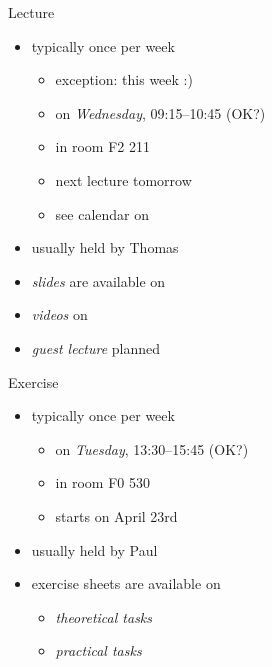 \begin{frame}{\myframetitle}
	\myframeicon{\fancyqr[image={\pic[width=10mm]{moodle-calendar}}]{\CalendarLink}}
	\begin{fancycolumns}
		\begin{definition}{Lecture}
			\begin{itemize}
				\item typically once per week
				\begin{itemize}
					\item exception: this week :)
					\item on \emph{Wednesday}, 09:15--10:45 (OK?)
					\item in room F2 211
					\item next lecture tomorrow
					\item see calendar on \Panda
				\end{itemize}
				\item usually held by Thomas
				\item \emph{slides} are available on \Panda
				\item \emph{videos} on \Youtube
				\item \emph{guest lecture} planned
			\end{itemize}
		\end{definition}
	\nextcolumn
		\begin{example}{Exercise}
			\begin{itemize}
				\item typically once per week
				\begin{itemize}
					\item on \emph{Tuesday}, 13:30--15:45 (OK?)
					\item in room F0 530
					\item starts on April 23rd
				\end{itemize}
				\item usually held by Paul
				\item exercise sheets are available on \Panda
				\begin{itemize}
					\item \emph{theoretical tasks}
					\item \emph{practical tasks}
				\end{itemize}
			\end{itemize}
		\end{example}
	\end{fancycolumns}
\end{frame}



